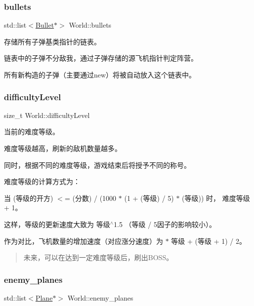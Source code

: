\subsubsection{\texorpdfstring{bullets}{bullets}}
{\footnotesize\ttfamily std\+::list$<$\hyperlink{class_bullet}{Bullet}$\ast$$>$ World\+::bullets}



存储所有子弹基类指针的链表。 

链表中的子弹不分敌我，通过子弹存储的源飞机指针判定阵营。

所有新构造的子弹（主要通过new）将被自动放入这个链表中。 \mbox{\label{class_world_a594e81a86f319eea4e8e5a2029cdaa90}} 
\subsubsection{\texorpdfstring{difficulty\+Level}{difficultyLevel}}
{\footnotesize\ttfamily size\+\_\+t World\+::difficulty\+Level}



当前的难度等级。 

难度等级越高，刷新的敌机数量越多。

同时，根据不同的难度等级，游戏结束后将授予不同的称号。

难度等级的计算方式为：
\begin{DoxyItemize}
\item 当 {\ttfamily (等级的开方) $<$= (分数) / (1000 $\ast$ (1 + (等级) / 5) $\ast$ (等级))} 时， 难度等级 + 1。
\item 这样，等级的更新速度大致为 {\ttfamily 等级$^\wedge$1.5} （{\ttfamily 等级 / 5}因子的影响较小）。
\item 作为对比，飞机数量的增加速度（对应涨分速度）为 { $\ast$ 等级 + (等级 + 1) / 2}。
\end{DoxyItemize}

\begin{quote}
未来，可以在达到一定难度等级后，刷出\+B\+O\+S\+S。 \end{quote}
\mbox{\label{class_world_a9692ac6798300e7fde98eb3ef1bb7c79}} 
\subsubsection{\texorpdfstring{enemy\+\_\+planes}{enemy\_planes}}
{\footnotesize\ttfamily std\+::list$<$\hyperlink{class_plane}{Plane}$\ast$$>$ World\+::enemy\+\_\+planes}



